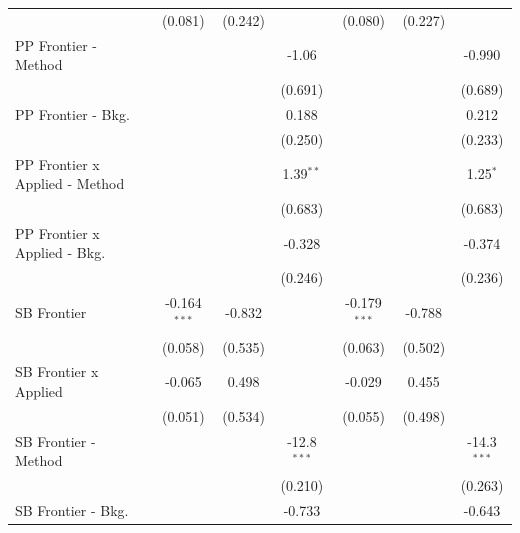 \begin{tabular}{lcccccc}
                                  & (0.081)        & (0.242)        &                & (0.080)        & (0.227)        &   \\   
   PP Frontier - Method           &                &                & -1.06          &                &                & -0.990\\   
                                  &                &                & (0.691)        &                &                & (0.689)\\   
   PP Frontier - Bkg.             &                &                & 0.188          &                &                & 0.212\\   
                                  &                &                & (0.250)        &                &                & (0.233)\\   
   PP Frontier x Applied - Method &                &                & 1.39$^{**}$    &                &                & 1.25$^{*}$\\   
                                  &                &                & (0.683)        &                &                & (0.683)\\   
   PP Frontier x Applied - Bkg.   &                &                & -0.328         &                &                & -0.374\\   
                                  &                &                & (0.246)        &                &                & (0.236)\\   
   SB Frontier                    & -0.164$^{***}$ & -0.832         &                & -0.179$^{***}$ & -0.788         &   \\   
                                  & (0.058)        & (0.535)        &                & (0.063)        & (0.502)        &   \\   
   SB Frontier x Applied          & -0.065         & 0.498          &                & -0.029         & 0.455          &   \\   
                                  & (0.051)        & (0.534)        &                & (0.055)        & (0.498)        &   \\   
   SB Frontier - Method           &                &                & -12.8$^{***}$  &                &                & -14.3$^{***}$\\   
                                  &                &                & (0.210)        &                &                & (0.263)\\   
   SB Frontier - Bkg.             &                &                & -0.733         &                &                & -0.643\\   

\end{tabular}
